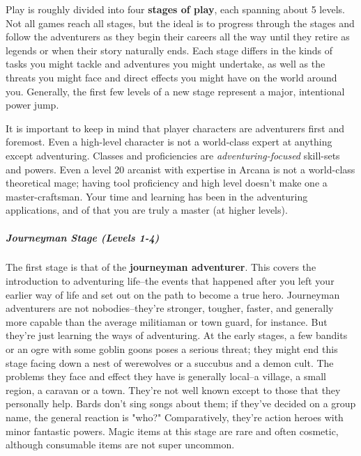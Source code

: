 Play is roughly divided into four \textbf{stages of play}, each spanning about 5 levels. Not all games reach all stages, but the ideal is to progress through the stages and follow the adventurers as they begin their careers all the way until they retire as legends or when their story naturally ends. Each stage differs in the kinds of tasks you might tackle and adventures you might undertake, as well as the threats you might face and direct effects you might have on the world around you. Generally, the first few levels of a new stage represent a major, intentional power jump.

It is important to keep in mind that player characters are adventurers first and foremost. Even a high-level character is not a world-class expert at anything except adventuring. Classes and proficiencies are \textit{adventuring-focused} skill-sets and powers. Even a level 20 arcanist with expertise in Arcana is not a world-class theoretical mage; having tool proficiency and high level doesn't make one a master-craftsman. Your time and learning has been in the adventuring applications, and of that you are truly a master (at higher levels).

\subparagraph*{Journeyman Stage (Levels 1-4)}
The first stage is that of the \textbf{journeyman adventurer}. This covers the introduction to adventuring life--the events that happened after you left your earlier way of life and set out on the path to become a true hero. Journeyman adventurers are not nobodies--they're stronger, tougher, faster, and generally more capable than the average militiaman or town guard, for instance. But they're just learning the ways of adventuring. At the early stages, a few bandits or an ogre with some goblin goons poses a serious threat; they might end this stage facing down a nest of werewolves or a succubus and a demon cult. The problems they face and effect they have is generally local--a village, a small region, a caravan or a town. They're not well known except to those that they personally help. Bards don't sing songs about them; if they've decided on a group name, the general reaction is "who?" Comparatively, they're action heroes with minor fantastic powers. Magic items at this stage are rare and often cosmetic, although consumable items are not super uncommon.

